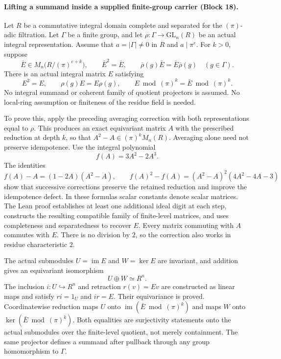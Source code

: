 \documentclass[11pt]{article}
\theoremstyle{definition}
\theoremstyle{remark}
\begin{document}
\paragraph{Lifting a summand inside a supplied finite-group carrier (Block 18).}
Let $R$ be a commutative integral domain complete and separated for the
$(\pi)$-adic filtration. Let $\Gamma$ be a finite group, and let
$\rho:\Gamma\to\mathrm{GL}_n(R)$ be an actual integral representation.
Assume that $a=|\Gamma|\ne0$ in $R$ and $a\mid\pi^e$. For $k>0$, suppose
\[
\bar E\in M_n\bigl(R/(\pi)^{e+k}\bigr),\qquad
\bar E^2=\bar E,\qquad
\bar\rho(g)\bar E=\bar E\bar\rho(g)\quad(g\in\Gamma).
\]
There is an actual integral matrix $E$ satisfying
\[
E^2=E,\qquad \rho(g)E=E\rho(g),\qquad
E\bmod(\pi)^k=\bar E\bmod(\pi)^k.
\]
No integral summand or coherent family of quotient projectors is assumed.
No local-ring assumption or finiteness of the residue field is needed.

To prove this, apply the preceding averaging correction with both
representations equal to $\rho$. This produces an exact equivariant matrix
$A$ with the prescribed reduction at depth $k$, so that
$A^2-A\in(\pi)^kM_n(R)$. Averaging alone need not preserve idempotence.
Use the integral polynomial
\[
f(A)=3A^2-2A^3.
\]
The identities
\[
f(A)-A=(1-2A)(A^2-A),\qquad
f(A)^2-f(A)=(A^2-A)^2(4A^2-4A-3)
\]
show that successive corrections preserve the retained reduction and improve
the idempotence defect. In these formulas scalar constants denote scalar
matrices. The Lean proof establishes at least one additional ideal digit at
each step, constructs the resulting compatible family of finite-level matrices, and uses
completeness and separatedness to recover $E$. Every matrix commuting with
$A$ commutes with $E$. There is no division by $2$, so the correction also
works in residue characteristic $2$.

The actual submodules $U=\operatorname{im}E$ and $W=\ker E$ are invariant,
and addition gives an equivariant isomorphism
\[
U\oplus W\simeq R^n.
\]
The inclusion $i:U\hookrightarrow R^n$ and retraction $r(v)=Ev$ are
constructed as linear maps and satisfy $ri=1_U$ and $ir=E$. Their
equivariance is proved. Coordinatewise reduction maps $U$ onto
$\operatorname{im}(\bar E\bmod(\pi)^k)$ and maps $W$ onto
$\ker(\bar E\bmod(\pi)^k)$. Both equalities are surjectivity statements
onto the actual submodules over the finite-level quotient, not merely containment. The same
projector defines a summand after pullback through any group homomorphism
to $\Gamma$.
\end{document}
